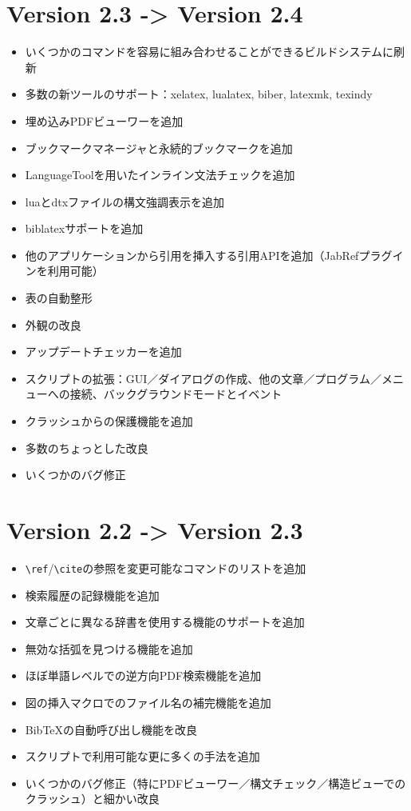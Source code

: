 \section{Version 2.3 -\textgreater{} Version 2.4}

\begin{itemize}
\item
  いくつかのコマンドを容易に組み合わせることができるビルドシステムに刷新
\item
  多数の新ツールのサポート：xelatex, lualatex, biber, latexmk, texindy
\item
  埋め込みPDFビューワーを追加
\item
  ブックマークマネージャと永続的ブックマークを追加
\item
  LanguageToolを用いたインライン文法チェックを追加
\item
  luaとdtxファイルの構文強調表示を追加
\item
  biblatexサポートを追加
\item
  他のアプリケーションから引用を挿入する引用APIを追加（JabRefプラグインを利用可能）
\item
  表の自動整形
\item
  外観の改良
\item
  アップデートチェッカーを追加
\item
  スクリプトの拡張：GUI／ダイアログの作成、他の文章／プログラム／メニューへの接続、バックグラウンドモードとイベント
\item
  クラッシュからの保護機能を追加
\item
  多数のちょっとした改良
\item
  いくつかのバグ修正
\end{itemize}

\section{Version 2.2 -\textgreater{} Version 2.3}

\begin{itemize}
\item
  \verb+\ref+/\verb+\cite+の参照を変更可能なコマンドのリストを追加
\item
  検索履歴の記録機能を追加
\item
  文章ごとに異なる辞書を使用する機能のサポートを追加
\item
  無効な括弧を見つける機能を追加
\item
  ほぼ単語レベルでの逆方向PDF検索機能を追加
\item
  図の挿入マクロでのファイル名の補完機能を追加
\item
  BibTeXの自動呼び出し機能を改良
\item
  スクリプトで利用可能な更に多くの手法を追加
\item
  いくつかのバグ修正（特にPDFビューワー／構文チェック／構造ビューでのクラッシュ）と細かい改良
\end{itemize}

